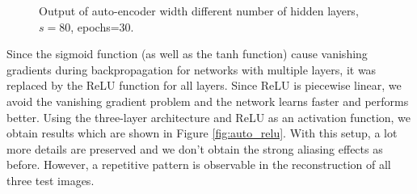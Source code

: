 \documentclass{article}
\begin{document}
\begin{figure}
\begin{subfigure}[b]{0.49 \textwidth}
    \end{subfigure}
    \caption{Output of auto-encoder width different number of hidden layers, $s=80$, epochs=$30$.}
    \label{fig:auto_layers}
\end{figure}

Since the sigmoid function (as well as the tanh function) cause vanishing gradients during backpropagation for networks with multiple layers, it was replaced by the ReLU function for all layers. Since ReLU is piecewise linear, we avoid the vanishing gradient problem and the network learns faster and performs better. Using the three-layer architecture and ReLU as an activation function, we obtain results which are shown in Figure \ref{fig:auto_relu}. With this setup, a lot more details are preserved and we don't obtain the strong aliasing effects as before. However, a repetitive pattern is observable in the reconstruction of all three test images. \\
\end{document}
